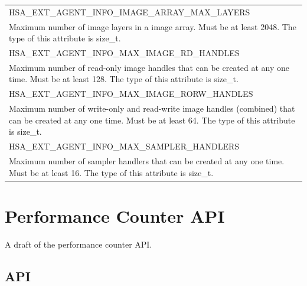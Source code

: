 \documentclass[final,oneside]{book}
\newcommand{\reftyp}[1]{#1}
\newcommand{\refenu}[1]{\reftyp{#1}}
\begin{document}
\begin{longtable}{@{\hspace{2em}}p{\linewidth-2em}}
\hspace{-2em}\refenu{HSA_\-EXT_\-AGENT_\-INFO_\-IMAGE_\-ARRAY_\-MAX_\-LAYERS}\\Maximum number of image layers in a image array. Must be at least 2048. The type of this attribute is size_\-t.\\[2mm]
\hspace{-2em}\refenu{HSA_\-EXT_\-AGENT_\-INFO_\-MAX_\-IMAGE_\-RD_\-HANDLES}\\Maximum number of read-only image handles that can be created at any one time. Must be at least 128. The type of this attribute is size_\-t.\\[2mm]
\hspace{-2em}\refenu{HSA_\-EXT_\-AGENT_\-INFO_\-MAX_\-IMAGE_\-RORW_\-HANDLES}\\Maximum number of write-only and read-write image handles (combined) that can be created at any one time. Must be at least 64. The type of this attribute is size_\-t.\\[2mm]
\hspace{-2em}\refenu{HSA_\-EXT_\-AGENT_\-INFO_\-MAX_\-SAMPLER_\-HANDLERS}\\Maximum number of sampler handlers that can be created at any one time. Must be at least 16. The type of this attribute is size_\-t.
\end{longtable} 

\section{Performance Counter API}\label{sec:perfcount}
A draft of the performance counter API.

\subsection{API}
\makeatletter{}
\end{document}
